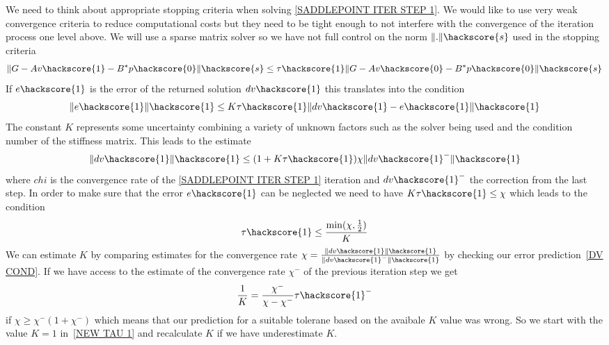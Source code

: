 We need to think about appropriate stopping criteria when solving 
\ref{SADDLEPOINT ITER STEP 1}. We would like to use very weak convergence criteria to reduce computational costs but they need to be tight enough to not interfere with the 
convergence of the iteration process one level above.
We will use a sparse matrix solver so we have not full control on the norm $\|.\|\hackscore{s}$ used in the stopping criteria 
\begin{equation} 
\| G - A v\hackscore{1} - B^{*} p\hackscore{0}  \|\hackscore{s} \le \tau\hackscore{1} \| G - A v\hackscore{0}  - B^{*} p\hackscore{0} \|\hackscore{s} 
\end{equation}
If $e\hackscore{1}$ is the error of the returned solution $dv\hackscore{1}$ this translates into the condition
\begin{equation} 
\| e\hackscore{1} \|\hackscore{1} \le K \tau\hackscore{1} \| dv\hackscore{1} - e\hackscore{1} \|\hackscore{1} 
\end{equation}
The constant $K$ represents some uncertainty combining a variety of unknown factors such as the 
solver being used and the condition number of the stiffness matrix.  This leads to the estimate 
\begin{equation} 
\| dv\hackscore{1} \|\hackscore{1} \le (1+K \tau\hackscore{1}) \chi \| dv\hackscore{1}^- \|\hackscore{1}
\label{DV COND}
\end{equation}
where $chi$ is the convergence rate of the \ref{SADDLEPOINT ITER STEP 1} iteration and $dv\hackscore{1}^-$ the correction from the last step. In order to make sure that the error $e\hackscore{1}$ can be neglected we need
to have $K \tau\hackscore{1} \le \chi$ which leads to the condition 
 \begin{equation}
 \tau\hackscore{1} \le \frac{\min(\chi,\frac{1}{2})}{K}
 \label{NEW TAU 1}
\end{equation}
We can estimate $K$ by comparing estimates for the convergence rate $\chi=\frac{\| dv\hackscore{1} \|\hackscore{1}}{\| dv\hackscore{1}^- \|\hackscore{1}}$ by checking our error prediction~\ref{DV COND}. If we have
access to the estimate of the convergence rate $\chi^-$ of the previous iteration step we 
get 
 \begin{equation}
 \frac{1}{K} = \frac{\chi^-}{\chi-\chi^{-}} \tau\hackscore{1}^-
\end{equation}
if $\chi \ge \chi^- (1 + \chi^-) $ which means that our prediction for a suitable tolerane based on the avaibale $K$ value was wrong.
So we start with the value $K=1$ in~\ref{NEW TAU 1} and recalculate 
$K$ if we have underestimate $K$. 







